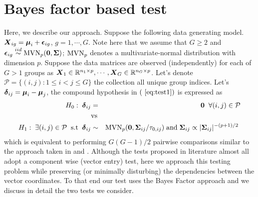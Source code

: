 \documentclass[12pt]{article}
\def\bzero{{\mathbf 0}}
\newcommand{\uzero}            {\mbox{\boldmath$0$}}
\def\MVN{\hbox{MVN}}
\def\be{\begin{eqnarray}}
\def\ee{\end{eqnarray}}
\def\bzero{{\mathbf 0}}
\newcommand{\uS}       {\mbox{\boldmath$S$}}
\newcommand{\uX}       {\mbox{\boldmath$X$}}
\newcommand{\udelta}            {\mbox{\boldmath$\delta$}}
\newcommand{\uepsilon}          {\mbox{\boldmath$\epsilon$}}
\newcommand{\umu}               {\mbox{\boldmath$\mu$}}
\newcommand{\uSigma}            {\mbox{\boldmath$\Sigma$}}
\begin{document}
\section{Bayes factor based test} \label{sec:test}
Here, we describe our approach. Suppose the following data generating model. $\uX_{ig} = \umu_i + \uepsilon_{ig}$, $g = 1, \cdots, G$.
 Note here that we assume that $G \geq 2$ and $\uepsilon_{ig} \stackrel{iid}{\sim} \MVN_{p}(\bzero, \uSigma)$; $\MVN_{p}$ denotes a multivariate-normal distribution with dimension $p$. Suppose the data matrices are observed (independently) for each of $G> 1$ groups as $\uX_1 \in \mathbb{R}^{n_1 \times p}, \cdots,  \uX_G \in \mathbb{R}^{n_G \times p}$. 
Let's denote $\mathcal{P} = \{(i,j): 1 \leq i < j \leq G \}$ the collection all unique group indices. %
Let's $\udelta_{ij} = \umu_i - \umu_j$, the compound hypothesis in $(~\ref{eq:test1})$ is expressed as
\be
H_0:\; \udelta_{ij} &=& \uzero\;\;\forall (i,j) \in \mathcal{P} \nonumber \\
 &\mbox{vs}& \nonumber \\
 H_1: \; \exists (i,j) \in \mathcal{P}\;\; \mbox{s.t}\;\; \udelta_{ij} &\sim& \MVN_{p}(\uzero, \uSigma_{ij}/\tau_{0,ij})\; \text{and}\; \uSigma_{ij} \propto |\uSigma_{ij}|^{-(p+1)/2} \; \label{eq:hyp1}
\ee
which is equivalent to performing $G(G-1)/2$ pairwise comparisons similar to the approach taken in \cite{tony2014two} and \cite{ahmad2014u}. Although the tests proposed in literature almost all adopt a component wise (vector entry) test, here we approach this testing problem while preserving (or minimally disturbing) the dependencies between the vector coordinates. To that end our test uses the Bayes Factor approach and we discuss in detail the two tests we consider.
\end{document}
